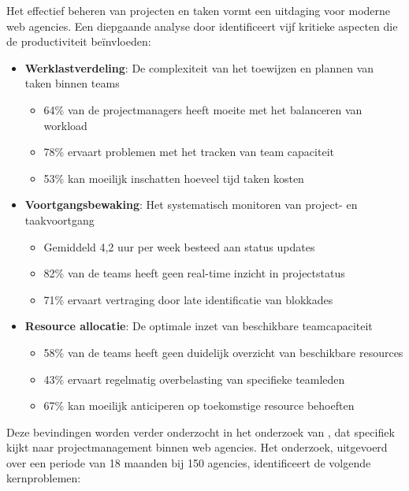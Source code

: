 Het effectief beheren van projecten en taken vormt een uitdaging voor moderne web agencies. Een diepgaande analyse door \textcite{Taylor2024} identificeert vijf kritieke aspecten die de productiviteit beïnvloeden:

\begin{itemize}
    \item \textbf{Werklastverdeling}: De complexiteit van het toewijzen en plannen van taken binnen teams
    \begin{itemize}
        \item 64\% van de projectmanagers heeft moeite met het balanceren van workload
        \item 78\% ervaart problemen met het tracken van team capaciteit
        \item 53\% kan moeilijk inschatten hoeveel tijd taken kosten
    \end{itemize}
    
    \item \textbf{Voortgangsbewaking}: Het systematisch monitoren van project- en taakvoortgang
    \begin{itemize}
        \item Gemiddeld 4,2 uur per week besteed aan status updates
        \item 82\% van de teams heeft geen real-time inzicht in projectstatus
        \item 71\% ervaart vertraging door late identificatie van blokkades
    \end{itemize}
    
    \item \textbf{Resource allocatie}: De optimale inzet van beschikbare teamcapaciteit
    \begin{itemize}
        \item 58\% van de teams heeft geen duidelijk overzicht van beschikbare resources
        \item 43\% ervaart regelmatig overbelasting van specifieke teamleden
        \item 67\% kan moeilijk anticiperen op toekomstige resource behoeften
    \end{itemize}
\end{itemize}

Deze bevindingen worden verder onderzocht in het onderzoek van \textcite{Rodriguez2023}, dat specifiek kijkt naar projectmanagement binnen web agencies. Het onderzoek, uitgevoerd over een periode van 18 maanden bij 150 agencies, identificeert de volgende kernproblemen:


